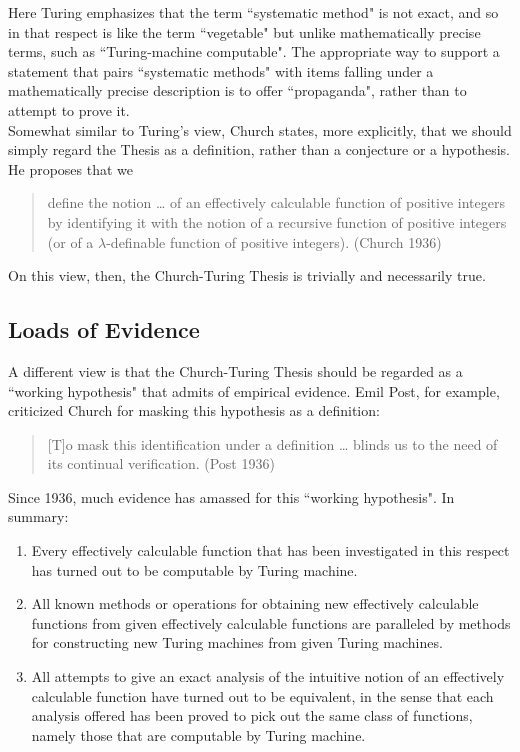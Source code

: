 \documentclass[11pt]{article}
\theoremstyle{definition}
\begin{document}
Here Turing emphasizes that the term ``systematic method" is not exact, and so in that respect is like the term ``vegetable" but unlike mathematically precise terms, such as ``Turing-machine computable". The appropriate way to support a statement that pairs ``systematic methods" with items falling under a mathematically precise description is to offer ``propaganda", rather than to attempt to prove it. \\

Somewhat similar to Turing's view, Church states, more explicitly, that we should simply regard the Thesis as a definition, rather than a conjecture or a hypothesis. He proposes that we

\begin{quote}
define the notion … of an effectively calculable function of positive integers by identifying it with the notion of a recursive function of positive integers (or of a $\lambda$-definable function of positive integers). (Church 1936)
\end{quote}

On this view, then, the Church-Turing Thesis is trivially and necessarily true.

\subsection{Loads of Evidence}

A different view is that the Church-Turing Thesis should be regarded as a ``working hypothesis" that admits of empirical evidence. Emil Post, for example, criticized Church for masking this hypothesis as a definition:

\begin{quote}
[T]o mask this identification under a definition … blinds us to the need of its continual verification. (Post 1936)
\end{quote}

Since 1936, much evidence has amassed for this ``working hypothesis". In summary:

\begin{enumerate}
\item Every effectively calculable function that has been investigated in this respect has turned out to be computable by Turing machine.
\item All known methods or operations for obtaining new effectively calculable functions from given effectively calculable functions are paralleled by methods for constructing new Turing machines from given Turing machines.
\item All attempts to give an exact analysis of the intuitive notion of an effectively calculable function have turned out to be equivalent, in the sense that each analysis offered has been proved to pick out the same class of functions, namely those that are computable by Turing machine.
\end{enumerate}
\end{document}
